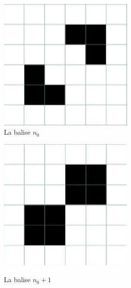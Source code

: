 \documentclass[12,french]{report}
\begin{document}
\begin{figure}[H]
    \begin{minipage}[c]{.46\linewidth}
        \centering
        \includegraphics[width=0.6\textwidth]{./Images/11}\\
        \caption{La balise $n_{0}$}
    \end{minipage}
    \hfill%
    \begin{minipage}[c]{.46\linewidth}
        \centering
        \includegraphics[width=0.6\textwidth]{./Images/11'}\\
        \caption{La balise $n_{0}+1$}
    \end{minipage}
\end{figure}\vspace{0.25cm}
\end{document}
